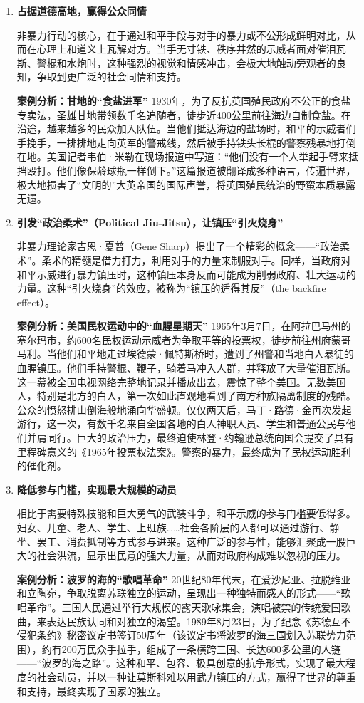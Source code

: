 \begin{enumerate}
    \item \textbf{占据道德高地，赢得公众同情}

    非暴力行动的核心，在于通过和平手段与对手的暴力或不公形成鲜明对比，从而在心理上和道义上瓦解对方。当手无寸铁、秩序井然的示威者面对催泪瓦斯、警棍和水炮时，这种强烈的视觉和情感冲击，会极大地触动旁观者的良知，争取到更广泛的社会同情和支持。

    \textbf{案例分析：甘地的“食盐进军”}
    1930年，为了反抗英国殖民政府不公正的食盐专卖法，圣雄甘地带领数千名追随者，徒步近400公里前往海边自制食盐。在沿途，越来越多的民众加入队伍。当他们抵达海边的盐场时，和平的示威者们手挽手，一排排地走向英军的警戒线，然后被手持铁头长棍的警察残暴地打倒在地。美国记者韦伯·米勒在现场报道中写道：“他们没有一个人举起手臂来抵挡殴打。他们像保龄球瓶一样倒下。”这篇报道被翻译成多种语言，传遍世界，极大地损害了“文明的”大英帝国的国际声誉，将英国殖民统治的野蛮本质暴露无遗。

    \item \textbf{引发“政治柔术”（Political Jiu-Jitsu），让镇压“引火烧身”}

    非暴力理论家吉恩·夏普（Gene Sharp）提出了一个精彩的概念——“政治柔术”。柔术的精髓是借力打力，利用对手的力量来制服对手。同样，当政府对和平示威进行暴力镇压时，这种镇压本身反而可能成为削弱政府、壮大运动的力量。这种“引火烧身”的效应，被称为“镇压的适得其反”（the backfire effect）。

    \textbf{案例分析：美国民权运动中的“血腥星期天”}
    1965年3月7日，在阿拉巴马州的塞尔玛市，约600名民权运动示威者为争取平等的投票权，徒步前往州府蒙哥马利。当他们和平地走过埃德蒙·佩特斯桥时，遭到了州警和当地白人暴徒的血腥镇压。他们手持警棍、鞭子，骑着马冲入人群，并释放了大量催泪瓦斯。这一幕被全国电视网络完整地记录并播放出去，震惊了整个美国。无数美国人，特别是北方的白人，第一次如此直观地看到了南方种族隔离制度的残酷。公众的愤怒排山倒海般地涌向华盛顿。仅仅两天后，马丁·路德·金再次发起游行，这一次，有数千名来自全国各地的白人神职人员、学生和普通公民与他们并肩同行。巨大的政治压力，最终迫使林登·约翰逊总统向国会提交了具有里程碑意义的《1965年投票权法案》。警察的暴力，最终成为了民权运动胜利的催化剂。

    \item \textbf{降低参与门槛，实现最大规模的动员}

    相比于需要特殊技能和巨大勇气的武装斗争，和平示威的参与门槛要低得多。妇女、儿童、老人、学生、上班族……社会各阶层的人都可以通过游行、静坐、罢工、消费抵制等方式参与进来。这种广泛的参与性，能够汇聚成一股巨大的社会洪流，显示出民意的强大力量，从而对政府构成难以忽视的压力。

    \textbf{案例分析：波罗的海的“歌唱革命”}
    20世纪80年代末，在爱沙尼亚、拉脱维亚和立陶宛，争取脱离苏联独立的运动，呈现出一种独特而感人的形式——“歌唱革命”。三国人民通过举行大规模的露天歌咏集会，演唱被禁的传统爱国歌曲，来表达民族认同和对独立的渴望。1989年8月23日，为了纪念《苏德互不侵犯条约》秘密议定书签订50周年（该议定书将波罗的海三国划入苏联势力范围），约有200万民众手拉手，组成了一条横跨三国、长达600多公里的人链——“波罗的海之路”。这种和平、包容、极具创意的抗争形式，实现了最大程度的社会动员，并以一种让莫斯科难以用武力镇压的方式，赢得了世界的尊重和支持，最终实现了国家的独立。
\end{enumerate}

